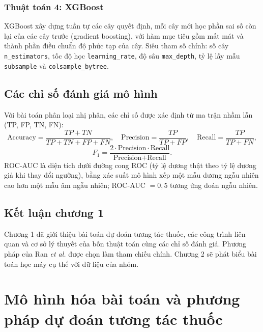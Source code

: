 \documentclass[12pt,a4paper,oneside]{report}
\newcommand{\tenbaitoan}{dự đoán tương tác thuốc} %
\begin{document}
\subsection{Thuật toán 4: XGBoost}
XGBoost \cite{chen2016} xây dựng tuần tự các cây quyết định, mỗi cây mới học phần
sai số còn lại của các cây trước (gradient boosting), với hàm mục tiêu gồm mất
mát và thành phần điều chuẩn độ phức tạp của cây. Siêu tham số chính: số cây
\texttt{n\_estimators}, tốc độ học \texttt{learning\_rate}, độ sâu
\texttt{max\_depth}, tỷ lệ lấy mẫu \texttt{subsample} và
\texttt{colsample\_bytree}.

\section{Các chỉ số đánh giá mô hình}
Với bài toán phân loại nhị phân, các chỉ số được xác định từ ma trận nhầm lẫn
(TP, FP, TN, FN):
\begin{equation}
  \text{Accuracy}=\frac{TP+TN}{TP+TN+FP+FN},\quad
  \text{Precision} = \frac{TP}{TP+FP},\quad
  \text{Recall} = \frac{TP}{TP+FN},
  \label{eq:acc}
\end{equation}
\begin{equation}
  F_1 = \frac{2\cdot\text{Precision}\cdot\text{Recall}}{\text{Precision}+\text{Recall}}.
  \label{eq:f1}
\end{equation}
ROC-AUC là diện tích dưới đường cong ROC (tỷ lệ dương thật theo tỷ lệ dương giả
khi thay đổi ngưỡng), bằng xác suất mô hình xếp một mẫu dương ngẫu nhiên cao hơn
một mẫu âm ngẫu nhiên; ROC-AUC $=0{,}5$ tương ứng đoán ngẫu nhiên.

\section{Kết luận chương 1}
Chương 1 đã giới thiệu bài toán dự đoán tương tác thuốc, các công trình liên
quan và cơ sở lý thuyết của bốn thuật toán cùng các chỉ số đánh giá. Phương
pháp của Ran \textit{et al.} \cite{ran2022} được chọn làm tham chiếu chính. Chương
2 sẽ phát biểu bài toán học máy cụ thể với dữ liệu của nhóm.

\chapter{Mô hình hóa bài toán và phương pháp \tenbaitoan}
\label{chap:phuongphap}
\end{document}

